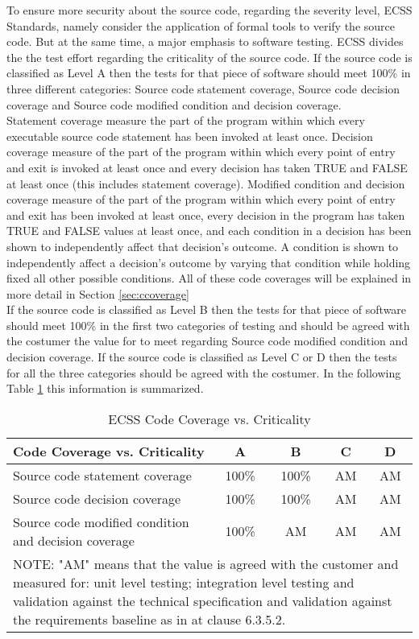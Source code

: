 To ensure more security about the source code, regarding the severity level, \ac{ECSS} Standards, namely \cite{ecss-q-st-40c}
consider the application of formal tools to verify the source code. But at the same time, a major emphasis to software testing.
\ac{ECSS} divides the the test effort regarding the criticality of the source code.
If the source code is classified as Level A then the tests for that piece of software should meet 100\% in
three different categories: Source code statement coverage, Source code decision coverage and Source code modified condition and decision coverage.\\
Statement coverage measure the part of the program within which every executable source code statement has been invoked at least once.
Decision coverage measure of the part of the program within which every point of entry and exit
is invoked at least once and every decision has taken TRUE and FALSE
at least once (this includes statement coverage).
Modified condition and decision coverage measure of the part of the program within which every point of entry and exit
has been invoked at least once, every decision in the program has taken TRUE and FALSE values at least once, and each condition in a decision has been
shown to independently affect that decision's outcome. A condition is shown to independently affect a
decision's outcome by varying that condition while holding fixed all other possible conditions. All of these code coverages will be explained in more detail in Section
\ref{sec:ccoverage}\\
If the source code is classified as Level B then the tests for that piece of software should meet 100\% in the first two categories of testing and should be
agreed with the costumer the value for to meet regarding Source code modified condition and decision coverage.
If the source code is classified as Level C or D then the tests for all the three categories should be agreed with the costumer.
In the following Table \ref{tab:ccoverage} this information is summarized.

\begin{table}[!ht]
\centering
\noindent \begin{tabular}{|m{6cm}|c|c|c|c|}
\hline
\textbf{Code Coverage vs. Criticality} & A & B & C & D \\\hline
Source code statement coverage & 100\% & 100\% & AM & AM \\\hline
Source code decision coverage & 100\% & 100\% & AM & AM \\\hline
Source code modified condition and decision coverage & 100\% & AM & AM & AM \\\hline
\multicolumn{5}{|m{14cm}|}{
NOTE: "AM" means that the value is agreed with the customer and measured for:
unit level testing; integration level testing and validation against the
technical specification and validation against the requirements baseline
as in \cite{ecss-q-st-80c} at clause 6.3.5.2.
}\\\hline
\end{tabular}
\caption{ECSS Code Coverage vs. Criticality}\label{tab:ccoverage}
\end{table}

